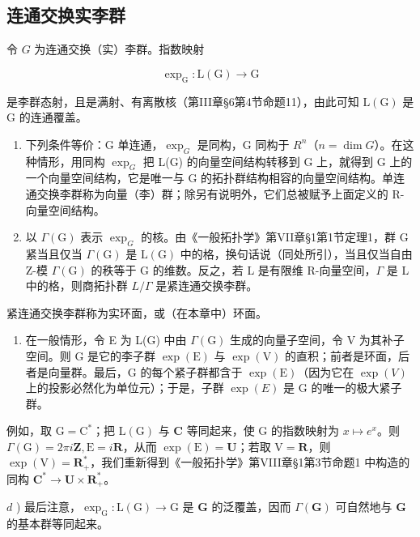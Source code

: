 \subsection{连通交换实李群}

令 \(G\) 为连通交换（实）李群。指数映射

\[
\exp_ {\mathrm{G}}: \mathrm{L} (\mathrm{G}) \to \mathrm{G}
\]

是李群态射，且是满射、有离散核（第III章§6第4节命题11），由此可知 \(\mathrm{L}(\mathrm{G})\) 是 \(\mathrm{G}\) 的连通覆盖。

\begin{enumerate}
\def\labelenumi{\alph{enumi})}
\item
  下列条件等价：G 单连通，\(\exp_{G}\) 是同构，G 同构于 \(R^{n}\)（\(n = \dim G\)）。在这种情形，用同构 \(\exp_{G}\) 把 L(G) 的向量空间结构转移到 G 上，就得到 G 上的一个向量空间结构，它是唯一与 G 的拓扑群结构相容的向量空间结构。单连通交换李群称为向量（李）群；除另有说明外，它们总被赋予上面定义的 R-向量空间结构。
\item
  以 \(\Gamma(\mathrm{G})\) 表示 \(\exp_{G}\) 的核。由《一般拓扑学》第VII章§1第1节定理1，群 G 紧当且仅当 \(\Gamma(\mathrm{G})\) 是 \(\mathrm{L}(\mathrm{G})\) 中的格，换句话说（同处所引），当且仅当自由 Z-模 \(\Gamma(\mathrm{G})\) 的秩等于 G 的维数。反之，若 L 是有限维 R-向量空间，\(\Gamma\) 是 L 中的格，则商拓扑群 \(L/\Gamma\) 是紧连通交换李群。
\end{enumerate}

紧连通交换李群称为实环面，或（在本章中）环面。

\begin{enumerate}
\def\labelenumi{\alph{enumi})}
\setcounter{enumi}{2}
\tightlist
\item
  在一般情形，令 E 为 L(G) 中由 \(\Gamma(\mathrm{G})\) 生成的向量子空间，令 V 为其补子空间。则 G 是它的李子群 \(\exp(\mathrm{E})\) 与 \(\exp(\mathrm{V})\) 的直积；前者是环面，后者是向量群。最后，G 的每个紧子群都含于 \(\exp(\mathrm{E})\)（因为它在 \(\exp(V)\) 上的投影必然化为单位元）；于是，子群 \(\exp(E)\) 是 G 的唯一的极大紧子群。
\end{enumerate}

例如，取 \(\mathrm{G} = \mathrm{C}^*\)；把 \(\mathrm{L(G)}\) 与 \(\mathbf{C}\) 等同起来，使 \(\mathrm{G}\) 的指数映射为 \(x \mapsto e^x\)。则 \(\Gamma(\mathrm{G}) = 2\pi i\mathbf{Z}, \mathrm{E} = i\mathbf{R}\)，从而 \(\exp(\mathrm{E}) = \mathbf{U}\)；若取 \(\mathrm{V} = \mathbf{R}\)，则 \(\exp(\mathrm{V}) = \mathbf{R}_+^*\)，我们重新得到《一般拓扑学》第VIII章§1第3节命题1 中构造的同构 \(\mathbf{C}^* \to \mathbf{U} \times \mathbf{R}_+^*\)。

\(d\) ) 最后注意，\(\exp_{\mathrm{G}}:\mathrm{L}(\mathrm{G})\to \mathrm{G}\) 是 \(\mathbf{G}\) 的泛覆盖，因而 \(\Gamma (\mathbf{G})\) 可自然地与 \(\mathbf{G}\) 的基本群等同起来。

